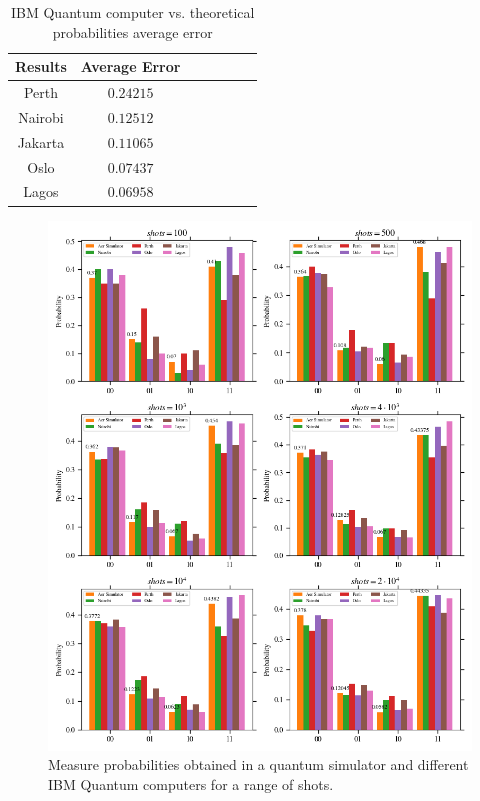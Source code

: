 \begin{table}[!ht]
    \centering
    {\renewcommand{\arraystretch}{1.2}%
    \begin{tabular}{c|cccccc}
    \hline
        Results & Average Error \\ \hline
        Perth & $\scriptstyle0.24215$  \\ 
        Nairobi & $\scriptstyle0.12512$  \\ 
        Jakarta & $\scriptstyle0.11065$  \\ 
        Oslo & $\scriptstyle0.07437$  \\ 
        Lagos & $\scriptstyle0.06958$ \\ \hline
    \end{tabular}}
    \caption{IBM Quantum computer vs. theoretical probabilities average error}
\end{table}

\begin{figure}[h!]
\centering
\includegraphics[width=\textwidth]{images/quantum_benchmark_probabilities.png}
\caption{Measure probabilities obtained in a quantum simulator and different IBM Quantum computers for a range of shots.}
\label{fig:quantum_benchmark_probabilities}
\end{figure}